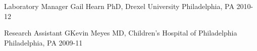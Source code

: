 

\begin{cvhonors}

    \cvhonor
    {Laboratory Manager} %
    {Gail Hearn PhD, Drexel University} %
    {Philadelphia, PA} %
    {2010-12} %

    \cvhonor
    {Research Assistant} %
    {GKevin Meyes MD, Children's Hospital of Philadelphia} %
    {Philadelphia, PA} %
    {2009-11} %
  
\end{cvhonors}
